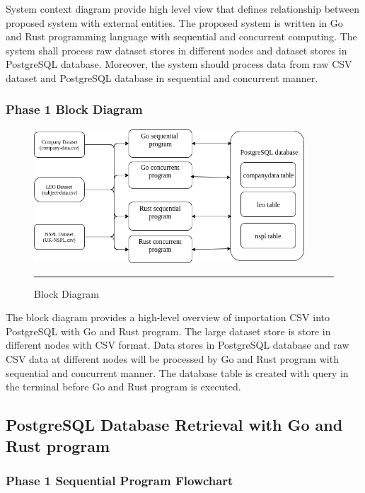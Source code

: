 System context diagram provide high level view that defines relationship between proposed system with external entities. The proposed system is written in Go and Rust programming language with sequential and concurrent computing. The system shall process raw dataset stores in different nodes and dataset stores in PostgreSQL database. Moreover, the system should process data from raw CSV dataset and PostgreSQL database in sequential and concurrent manner. 

\subsubsection{Phase 1 Block Diagram}

\begin{figure}[H]
	\centering
	\includegraphics[width=0.9\textwidth]{Figure/block-diagram.png}
	\rule{35em}{0.5pt}
	\caption[Block Diagram]{Block Diagram}
\end{figure}

The block diagram provides a high-level overview of importation CSV into PostgreSQL with Go and Rust program. The large dataset store is store in different nodes with CSV format. Data stores in PostgreSQL database and raw CSV data at different nodes will be processed by Go and Rust program with sequential and concurrent manner. The database table is created with query in the terminal before Go and Rust program is executed.

\subsection{PostgreSQL Database Retrieval with Go and Rust program}

\subsubsection{Phase 1 Sequential Program Flowchart}

